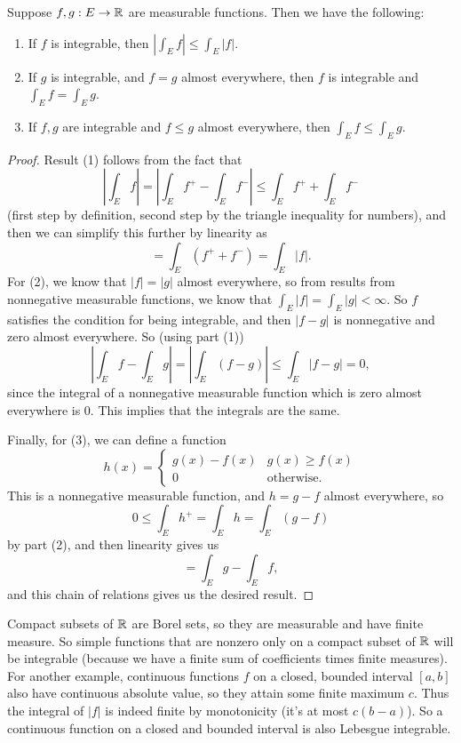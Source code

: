 \begin{proposition}
Suppose $f, g: E \to \mathbb R$ are measurable functions. Then we have the following:
\begin{enumerate}
\item If $f$ is integrable, then $\left|\int_E f \right| \le \int_E |f|$.
\item If $g$ is integrable, and $f = g$ almost everywhere, then $f$ is integrable and $\int_E f = \int_E g$. 
\item If $f, g$ are integrable and $f \le g$ almost everywhere, then $\int_E f \le \int_E g$. 
\end{enumerate}
\end{proposition}
\begin{proof}
Result (1) follows from the fact that 
\[
    \left| \int_E f \right| = \left| \int_E f^+ - \int_E f^- \right| \le \int_E f^+ + \int_E f^- 
\]
(first step by definition, second step by the triangle inequality for numbers), and then we can simplify this further by linearity as 
\[
    = \int_E (f^+ + f^-) = \int_E |f|. 
\]
For (2), we know that $|f| = |g|$ almost everywhere, so from results from nonnegative measurable functions, we know that $\int_E |f| = \int_E |g| < \infty$. So $f$ satisfies the condition for being integrable, and then $|f-g|$ is nonnegative and zero almost everywhere. So (using part (1))
\[
    \left|\int_E f - \int_E g\right| = \left|\int_E (f-g) \right| \le \int_E |f-g| = 0,
\]
since the integral of a nonnegative measurable function which is zero almost everywhere is $0$. This implies that the integrals are the same.

Finally, for (3), we can define a function
\[
    h(x) = \begin{cases} g(x) - f(x) & g(x) \ge f(x) \\ 0 & \text{otherwise}. \end{cases}
\]
This is a nonnegative measurable function, and $h = g-f$ almost everywhere, so 
\[
    0 \le \int_E h^+ = \int_E h = \int_E (g-f)
\]
by part (2), and then linearity gives us 
\[
    = \int_E g - \int_E f,
\]
and this chain of relations gives us the desired result.
\end{proof}

\begin{remark}
Compact subsets of $\mathbb R$ are Borel sets, so they are measurable and have finite measure. So simple functions that are nonzero only on a compact subset of $\mathbb R$ will be integrable (because we have a finite sum of coefficients times finite measures). For another example, continuous functions $f$ on a closed, bounded interval $[a, b]$ also have continuous absolute value, so they attain some finite maximum $c$. Thus the integral of $|f|$ is indeed finite by monotonicity (it's at most $c(b-a)$). So a continuous function on a closed and bounded interval is also Lebesgue integrable.
\end{remark}

